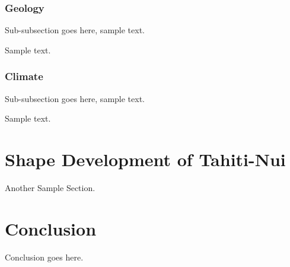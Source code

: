 \documentclass[12pt,journal,onecolumn]{IEEEtran}
\begin{document}
\subsubsection{Geology}

Sub-subsection goes here, sample text.

Sample text.

\subsubsection{Climate}

Sub-subsection goes here, sample text.

Sample text.

\section{Shape Development of Tahiti-Nui}

Another Sample Section.

\section{Conclusion}

Conclusion goes here.

\patchcmd{\section}{\raggedright}{\centering}{}{}
\patchcmd{\section}{\normalsize}{\large\bfseries}{}{}


\ifCLASSOPTIONcaptionsoff
  \newpage
\fi




\end{document}
